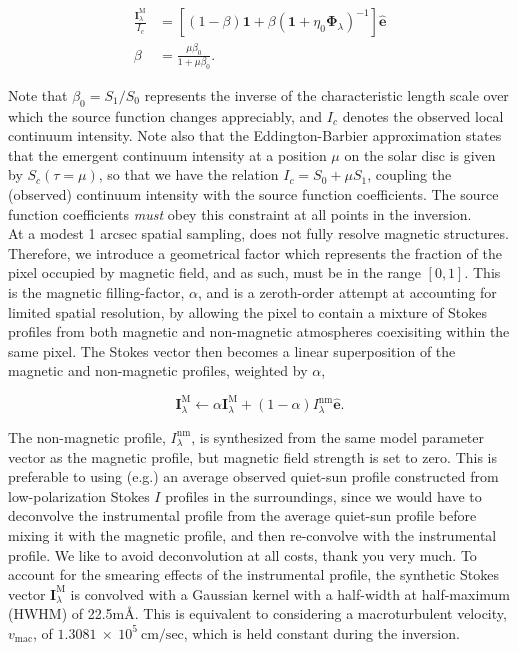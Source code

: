 \documentclass[11pt]{article}
\begin{document}
\begin{align}
\frac{\mathbf{I}_{\lambda}^{\mathrm{M}}}{I_{c}} &= \left[ \left(1-\beta\right)\mathbf{1} +
        \beta\left( \mathbf{1} + \eta_{0}\mathbf{\Phi}_{\lambda} \right)^{-1}
        \right]\hat{\mathbf{e}}\\
\beta &= \frac{\mu\beta_{0}}{1+\mu\beta_{0}}.
\end{align}

Note that $\beta_{0}=S_{1}/S_{0}$ represents the inverse of the characteristic
length scale over which the source function changes appreciably, and $I_{c}$ denotes the
observed local continuum intensity.  Note also that the Eddington-Barbier
approximation states that the emergent continuum intensity at a position $\mu$ on the solar disc
is given by $S_{c}(\tau=\mu)$, so that we have the relation $I_{c} = S_{0} + \mu S_{1}$, coupling
the (observed) continuum intensity with the source function coefficients.  The source function
coefficients \textit{must} obey this constraint at all points in the inversion.\\

At a modest 1 arcsec spatial sampling, \solisvsm does not fully resolve magnetic structures.
Therefore, we introduce a geometrical factor which represents the fraction of the pixel occupied
by magnetic field, and as such, must be in the range $[0,1]$.  This is the magnetic filling-factor,
$\alpha$, and is a zeroth-order attempt at accounting for limited spatial resolution, by allowing
the pixel to contain a mixture of Stokes profiles from both magnetic and non-magnetic atmospheres
coexisiting within the same pixel.  The Stokes vector then becomes a linear superposition of
the magnetic and non-magnetic profiles, weighted by $\alpha$,

\begin{equation}
\mathbf{I}_{\lambda}^{\mathrm{M}} \leftarrow \alpha\mathbf{I}^{\mathrm{M}}_{\lambda} +
        (1-\alpha)I^{\mathrm{nm}}_{\lambda}\hat{\mathbf{e}}.
\end{equation}

The non-magnetic profile, $I^{\mathrm{nm}}_{\lambda}$, is synthesized from the same
model parameter vector as the magnetic profile, but magnetic field strength is 
set to zero.  This is preferable to using (e.g.) an average observed quiet-sun profile
constructed from low-polarization Stokes $I$ profiles in the surroundings, since we would
have to deconvolve the instrumental profile from the average quiet-sun profile before mixing
it with the magnetic profile, and then re-convolve with the instrumental profile.  We like to avoid
deconvolution at all costs, thank you very much.  To account for the smearing effects of the 
\solisvsm instrumental profile, the synthetic Stokes vector $\mathbf{I}^{\mathrm{M}}_{\lambda}$ is
convolved with a Gaussian kernel with a half-width at half-maximum (HWHM) of 22.5m\AA.  This is 
equivalent to considering a macroturbulent velocity, $v_{\mathrm{mac}}$, of $1.3081\ \times\ 10^{5}\ \mathrm{cm/sec}$,
which is held constant during the inversion.\\
\end{document}
